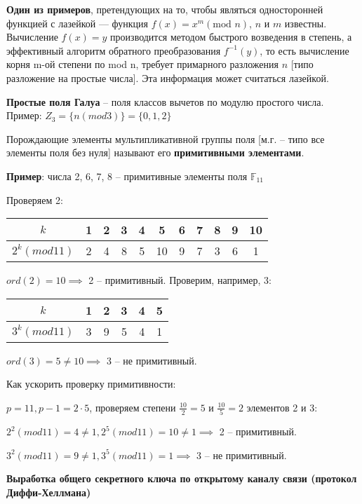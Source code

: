 \textbf{Один из примеров}, претендующих на то, чтобы являться односторонней функцией с лазейкой --- функция $f(x) = x^m (\text{mod } n)$, $n$ и $m$ известны.
Вычисление $f(x) = y$ производится методом быстрого возведения в степень, а эффективный алгоритм обратного преобразования $f^{-1}(y)$, то есть вычисление корня m-ой степени по mod n, требует примарного разложения $n$ [типо разложение на простые числа].
Эта информация может считаться лазейкой.

\textbf{Простые поля Галуа} -- поля классов вычетов по модулю простого числа. Пример: $Z_3 = \{n (mod  3)\} = \{0, 1, 2\}$

Порождающие элементы мультипликативной группы поля [м.г. -- типо все элементы поля без нуля] называют его \textbf{примитивными элементами}.

\textbf{Пример}: числа 2, 6, 7, 8 -- примитивные элементы поля $\mathbb{F}_{11}$

Проверяем 2:

\begin{tabular}{c|c c c c c c c c c c}
    \hline
     $k$           & 1 & 2 & 3 & 4 & 5  & 6 & 7 & 8 & 9 & 10 \\
    \hline
     $2^k (mod 11)$ & 2 & 4 & 8 & 5 & 10 & 9 & 7 & 3 & 6 & 1 \\
    \hline
\end{tabular}

$ord(2) = 10 \implies$ 2 -- примитивный. Проверим, например, 3:

\begin{tabular}{c|c c c c c}
    \hline
     $k$            & 1 & 2 & 3 & 4 & 5 \\
    \hline
     $3^k (mod 11)$ & 3 & 9 & 5 & 4 & 1 \\
    \hline
\end{tabular}

$ord(3) = 5 \neq 10 \implies$ 3 -- не примитивный.

Как ускорить проверку примитивности:

$p = 11, p-1=2 \cdot 5$, проверяем степени $\frac{10}{2} = 5$ и $\frac{10}{5} = 2$ элементов 2 и 3:

$2^2(mod 11) = 4 \neq 1, 2^5(mod 11) = 10 \neq 1 \implies$ 2 -- примитивный.

$3^2(mod 11) = 9 \neq 1, 3^5(mod 11) = 1 \implies$ 3 -- не примитивный.

\textbf{Выработка общего секретного ключа по открытому каналу связи (протокол Диффи-Хеллмана)}

